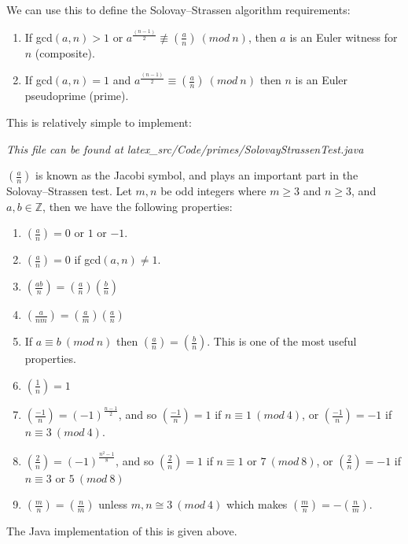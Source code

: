     We can use this to define the Solovay--Strassen algorithm requirements:
    
    \begin{enumerate}
      \item If gcd$(a,n) > 1$ or $a^{\frac{(n-1)}{2}} \not\equiv (\frac{a}{n}) \ (mod \ n)$, then $a$ is an Euler witness for $n$ (composite).
      \item If gcd$(a,n) = 1$ and $a^{\frac{(n-1)}{2}} \equiv (\frac{a}{n}) \ (mod \ n)$ then $n$ is an Euler pseudoprime (prime).
    \end{enumerate}
    
    This is relatively simple to implement:
    
    
    \emph{This file can be found at latex\_src/Code/primes/SolovayStrassenTest.java} \\
    
    \begin{mathdef}
      $(\frac{a}{n})$ is known as the Jacobi symbol, and plays an important part in the Solovay--Strassen test. Let $m,n$ be odd integers where $m \geq 3$ and $n \geq 3$, and $a,b \in \mathbb{Z}$, then we have the following properties\cite{Alfred-Menezes:1996kx}:
    
      \begin{enumerate}
        \item $(\frac{a}{n}) = 0$ or $1$ or $-1$.
        \item $(\frac{a}{n}) = 0$ if gcd$(a,n) \neq 1$.
        \item $(\frac{ab}{n}) = (\frac{a}{n}) (\frac{b}{n})$
        \item $(\frac{a}{nm}) = (\frac{a}{m}) (\frac{a}{n})$
        \item If $a \equiv b \ (mod \ n)$ then $(\frac{a}{n}) = (\frac{b}{n})$. This is one of the most useful properties.
        \item $(\frac{1}{n}) = 1$
        \item $(\frac{-1}{n}) = (-1)^{\frac{n-1}{2}}$, and so $(\frac{-1}{n}) = 1$ if $n \equiv 1 \ (mod \ 4)$, or $(\frac{-1}{n}) = -1$ if $n \equiv 3 \ (mod \ 4)$.
        \item $(\frac{2}{n}) = (-1)^{\frac{n^2-1}{8}}$, and so $(\frac{2}{n}) = 1$ if $n \equiv 1 $ or $ 7 \ (mod \ 8)$, or $(\frac{2}{n}) = -1$ if $n \equiv 3 $ or $ 5 \ (mod \ 8)$
        \item $(\frac{m}{n}) = (\frac{n}{m})$ unless $m,n \cong 3 \ (mod \ 4)$ which makes $(\frac{m}{n}) = -(\frac{n}{m})$.
      \end{enumerate}
    
      The Java implementation of this is given above.
    \end{mathdef}
    
